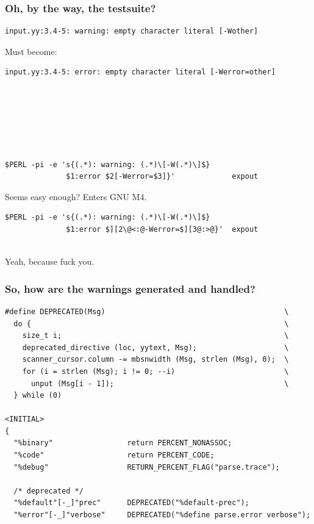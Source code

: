 \documentclass{beamer}
\begin{document}
\begin{frame}[fragile,shrink=25]
  \frametitle{Oh, by the way, the testsuite?}
\begin{verbatim}
input.yy:3.4-5: warning: empty character literal [-Wother]
\end{verbatim}

Must become:

\begin{verbatim}
input.yy:3.4-5: error: empty character literal [-Werror=other]
\end{verbatim}

\pause

\begin{verbatim}






$PERL -pi -e 's{(.*): warning: (.*)\[-W(.*)\]$}
              $1:error $2[-Werror=$3]}'             expout
\end{verbatim}

Seems easy enough?  \pause Enters GNU M4.

\begin{verbatim}
$PERL -pi -e 's{(.*): warning: (.*)\[-W(.*)\]$}
              $1:error $][2\@<:@-Werror=$][3@:>@}'  expout


\end{verbatim}

Yeah, because fuck you.
\end{frame}

\begin{frame}[fragile,shrink=25]
  \frametitle{So, how are the warnings generated and handled?}
\begin{verbatim}
#define DEPRECATED(Msg)                                         \
  do {                                                          \
    size_t i;                                                   \
    deprecated_directive (loc, yytext, Msg);                    \
    scanner_cursor.column -= mbsnwidth (Msg, strlen (Msg), 0);  \
    for (i = strlen (Msg); i != 0; --i)                         \
      unput (Msg[i - 1]);                                       \
  } while (0)

<INITIAL>
{
  "%binary"                 return PERCENT_NONASSOC;
  "%code"                   return PERCENT_CODE;
  "%debug"                  RETURN_PERCENT_FLAG("parse.trace");

  /* deprecated */
  "%default"[-_]"prec"      DEPRECATED("%default-prec");
  "%error"[-_]"verbose"     DEPRECATED("%define parse.error verbose");
\end{verbatim}
\end{frame}
\end{document}
